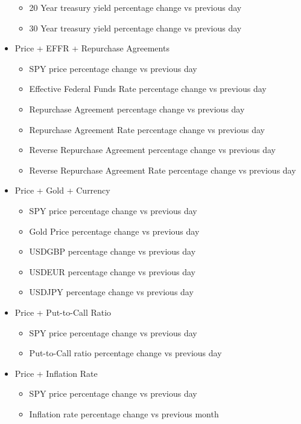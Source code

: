 \begin{itemize}
\begin{itemize}
        \item 20 Year treasury yield percentage change vs previous day
        \item 30 Year treasury yield percentage change vs previous day
    \end{itemize}
    \item Price + EFFR + Repurchase Agreements
    \begin{itemize}
        \item SPY price percentage change vs previous day
        \item Effective Federal Funds Rate percentage change vs previous day
        \item Repurchase Agreement percentage change vs previous day
        \item Repurchase Agreement Rate percentage change vs previous day
        \item Reverse Repurchase Agreement percentage change vs previous day
        \item Reverse Repurchase Agreement Rate percentage change vs previous day
    \end{itemize}
    \item Price + Gold + Currency
    \begin{itemize}
        \item SPY price percentage change vs previous day
        \item Gold Price percentage change vs previous day
        \item USDGBP percentage change vs previous day
        \item USDEUR percentage change vs previous day
        \item USDJPY percentage change vs previous day
    \end{itemize}
    \item Price + Put-to-Call Ratio
    \begin{itemize}
        \item SPY price percentage change vs previous day
        \item Put-to-Call ratio percentage change vs previous day
    \end{itemize}
    \item Price + Inflation Rate
    \begin{itemize}
        \item SPY price percentage change vs previous day
        \item Inflation rate percentage change vs previous month
    \end{itemize}

\end{itemize}

